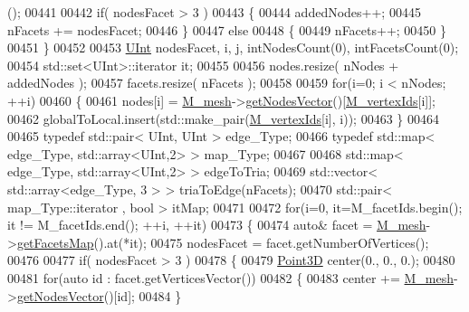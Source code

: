 \begin{DoxyCode}
      ();
00441 
00442             \textcolor{keywordflow}{if}( nodesFacet > 3 )
00443             \{
00444                 addedNodes++;
00445                 nFacets += nodesFacet;
00446             \}
00447             \textcolor{keywordflow}{else}
00448             \{
00449                 nFacets++;
00450             \}
00451         \}
00452 
00453         \hyperlink{namespaceFVCode3D_a4bf7e328c75d0fd504050d040ebe9eda}{UInt} nodesFacet, i, j, intNodesCount(0), intFacetsCount(0);
00454         std::set<UInt>::iterator it;
00455 
00456         nodes.resize( nNodes + addedNodes );
00457         facets.resize( nFacets );
00458 
00459         \textcolor{keywordflow}{for}(i=0; i < nNodes; ++i)
00460         \{
00461             nodes[i] = \hyperlink{classFVCode3D_1_1Mesh3D_1_1Cell3D_a5f593479ad61eb1a043b7ec977db39bb}{M\_mesh}->\hyperlink{classFVCode3D_1_1Mesh3D_a04162ec60e0fe52674b3ecbb7de1185c}{getNodesVector}()[\hyperlink{classFVCode3D_1_1Mesh3D_1_1Cell3D_a1c43369fa1a00208ff3293aad35a70aa}{M\_vertexIds}[i]];
00462             globalToLocal.insert(std::make\_pair(\hyperlink{classFVCode3D_1_1Mesh3D_1_1Cell3D_a1c43369fa1a00208ff3293aad35a70aa}{M\_vertexIds}[i], i));
00463         \}
00464 
00465         \textcolor{keyword}{typedef} std::pair< UInt, UInt > edge\_Type;
00466         \textcolor{keyword}{typedef} std::map< edge\_Type, std::array<UInt,2> > map\_Type;
00467 
00468         std::map< edge\_Type, std::array<UInt,2> > edgeToTria;
00469         std::vector< std::array<edge\_Type, 3 > > triaToEdge(nFacets);
00470         std::pair< map\_Type::iterator , bool > itMap;
00471 
00472         \textcolor{keywordflow}{for}(i=0, it=M\_facetIds.begin(); it != M\_facetIds.end(); ++i, ++it)
00473         \{
00474             \textcolor{keyword}{auto}& facet = \hyperlink{classFVCode3D_1_1Mesh3D_1_1Cell3D_a5f593479ad61eb1a043b7ec977db39bb}{M\_mesh}->\hyperlink{classFVCode3D_1_1Mesh3D_a76de387da2a552e3e1210d795bc7acf9}{getFacetsMap}().at(*it);
00475             nodesFacet = facet.getNumberOfVertices();
00476 
00477             \textcolor{keywordflow}{if}( nodesFacet > 3 )
00478             \{
00479                 \hyperlink{classFVCode3D_1_1Point3D}{Point3D} center(0., 0., 0.);
00480 
00481                 \textcolor{keywordflow}{for}(\textcolor{keyword}{auto} \textcolor{keywordtype}{id} : facet.getVerticesVector())
00482                 \{
00483                     center += \hyperlink{classFVCode3D_1_1Mesh3D_1_1Cell3D_a5f593479ad61eb1a043b7ec977db39bb}{M\_mesh}->\hyperlink{classFVCode3D_1_1Mesh3D_a04162ec60e0fe52674b3ecbb7de1185c}{getNodesVector}()[id];
00484                 \}

\end{DoxyCode}
